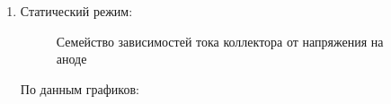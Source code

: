 \documentclass[12pt,a4paper]{article}
\begin{document}
\begin{enumerate}
\item Статический режим:
\begin{figure}[h!]
\caption{Семейство зависимостей тока коллектора от напряжения на аноде}
\end{figure}

По данным графиков:

\begin{itemize}


\end{itemize}
\end{enumerate}
\end{document}
